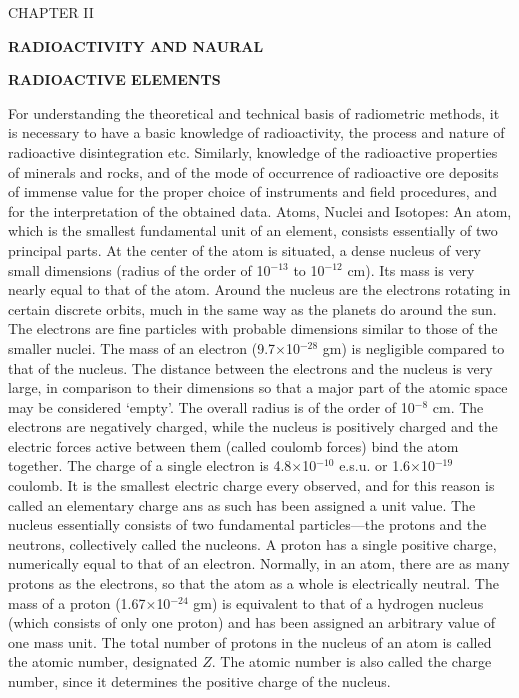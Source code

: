 \topglue 0pt
\vskip 2cm
\centerline{CHAPTER II}
\vskip 2cm
\centerline{\bf RADIOACTIVITY AND NAURAL}
\centerline{\bf RADIOACTIVE ELEMENTS}
\vskip 2cm
{\sc For understanding the} theoretical and technical basis of radiometric methods, it is necessary to have a basic knowledge of radioactivity, the process and nature of radioactive disintegration etc.
Similarly, knowledge of the radioactive properties of minerals and rocks, and of the mode of occurrence of radioactive ore deposits of immense value for the proper choice of instruments and field procedures, and for the interpretation of the obtained data.
\bigskip
\noindent
{ Atoms, Nuclei and Isotopes:}
\smallskip
An atom, which is the smallest fundamental unit of an element, consists essentially of two principal parts.
At the center of the atom is situated, a dense nucleus of very small dimensions (radius of the order of 10$^{-13}$ to 10$^{-12}$ cm).
Its mass is very nearly equal to that of the atom.
Around the nucleus are the electrons rotating in certain discrete orbits, much in the same way as the planets do around the sun.
The electrons are fine particles with probable dimensions similar to those of the smaller nuclei.
The mass of an electron (9.7$\times$10$^{-28}$ gm) is negligible compared to that of the nucleus.
The distance between the electrons and the nucleus is very large, in comparison to their dimensions so that a major part of the atomic space may be considered `empty'.
The overall radius is of the order of 10$^{-8}$ cm.
\smallskip
The electrons are negatively charged, while the nucleus is positively charged and the electric forces active between them (called coulomb forces) bind the atom together.
The charge of a single electron is 4.8$\times$10$^{-10}$ e.s.u. or 1.6$\times$10$^{-19}$ coulomb.
It is the smallest electric charge every observed, and for this reason is called an elementary charge ans as such has been assigned a unit value.
\smallskip
The nucleus essentially consists of two fundamental particles---the protons and the neutrons, collectively called the nucleons.
A proton has a single positive charge, numerically equal to that of an electron.
Normally, in an atom, there are as many protons as the electrons, so that the atom as a whole is electrically neutral.
The mass of a proton (1.67$\times$10$^{-24}$ gm) is equivalent to that of a hydrogen nucleus (which consists of only one proton) and has been assigned an arbitrary value of one mass unit.
\smallskip
The total number of protons in the nucleus of an atom is called the atomic number, designated $Z$.
The atomic number is also called the charge number, since it determines the positive charge of the nucleus.
